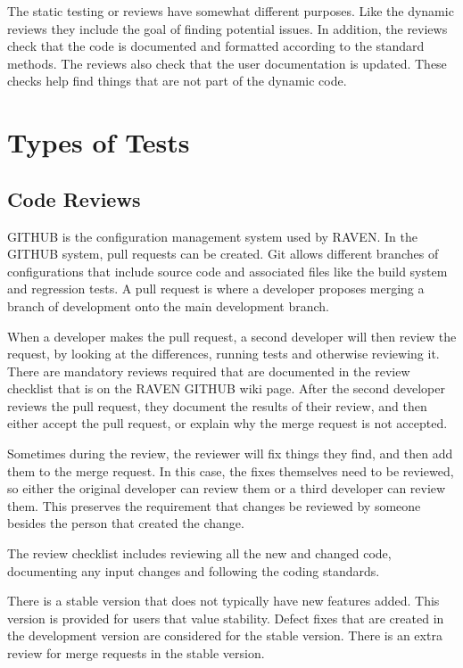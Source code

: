 \documentclass{article}
\begin{document}
The static testing or reviews have somewhat different purposes.  Like
the dynamic reviews they include the goal of finding potential
issues. In addition, the reviews check that the code is documented and
formatted according to the standard methods.  The reviews also check
that the user documentation is updated.  These checks help find things
that are not part of the dynamic code.

\section{Types of Tests}

\subsection{Code Reviews}

GITHUB is the configuration management system used by RAVEN. In the
GITHUB system, pull requests can be created.  Git allows different
branches of configurations that include source code and associated
files like the build system and regression tests.  A pull request is
where a developer proposes merging a branch of development onto the
main development branch.

When a developer makes the pull request, a second developer will then
review the request, by looking at the differences, running tests and
otherwise reviewing it.  There are mandatory reviews required that are
documented in the review checklist that is on the RAVEN GITHUB wiki page. 
 After the
second developer reviews the pull request, they document the
results of their review, and then either accept the pull request, or
explain why the merge request is not accepted.

Sometimes during the review, the reviewer will fix things they find,
and then add them to the merge request.  In this case, the fixes
themselves need to be reviewed, so either the original developer can
review them or a third developer can review them.  This preserves the
requirement that changes be reviewed by someone besides the person
that created the change.

The review checklist includes reviewing all the new and changed code,
documenting any input changes and following the coding standards.

There is a stable version that does not typically have new features
added.  This version is provided for users that value stability.
Defect fixes that are created in the development version are
considered for the stable version.  There is an extra review for merge
requests in the stable version.
\end{document}
